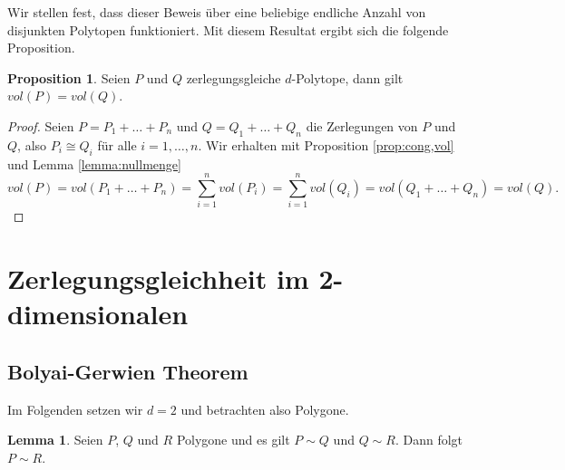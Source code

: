 \documentclass[11pt,titlepage]{article}
\theoremstyle{definition}
\newtheorem{proposition}[theorem]{Proposition}
\newtheorem{lemma}[theorem]{Lemma}
\theoremstyle{remark}
\begin{document}
	Wir stellen fest, dass dieser Beweis über eine beliebige endliche Anzahl von disjunkten 
	Polytopen funktioniert. Mit diesem Resultat ergibt sich die folgende Proposition.
	
	\begin{proposition} \label{prop:zerl,vol}
		Seien $P$ und $Q$ zerlegungsgleiche $d$-Polytope, dann gilt $vol(P)=vol(Q)$.
	\end{proposition}
	
	\begin{proof}
		Seien $P=P_1+\ldots+P_n$ und $Q=Q_1+\ldots+Q_n$ die Zerlegungen von $P$ und 
		$Q$, also $P_i\cong Q_i$ für alle $i=1,\ldots,n$. Wir erhalten mit Proposition \ref{prop:cong,vol} und Lemma \ref{lemma:nullmenge} 
		\[vol(P)=vol(P_1+\ldots+P_n)=\sum_{i=1}^n vol(P_i)=\sum_{i=1}^n vol(Q_i)=vol(Q_1+\ldots+Q_n)=vol(Q).\]
	\end{proof}

	\newpage
	
	\section{Zerlegungsgleichheit im 2-dimensionalen}
	
	\subsection{Bolyai-Gerwien Theorem}
	
	Im Folgenden setzen wir $d=2$ und betrachten also Polygone.
	
	\begin{lemma} \label{lemma:transitiv}
		Seien $P$, $Q$ und $R$ Polygone und es gilt $P\sim Q$ und $Q\sim R$. Dann folgt $P\sim R$.
	\end{lemma}
	
\end{document}
